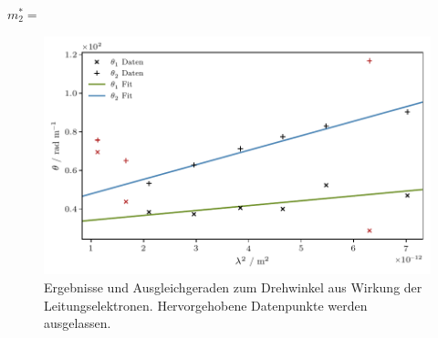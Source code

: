 $m^{*}_2 = $

\begin{figure}[H]
    \centering
    \includegraphics{build/mass.pdf}
    \caption{Ergebnisse und Ausgleichgeraden zum Drehwinkel aus Wirkung der Leitungselektronen.
             Hervorgehobene Datenpunkte werden ausgelassen.}
    \label{fig:masse}
\end{figure}

